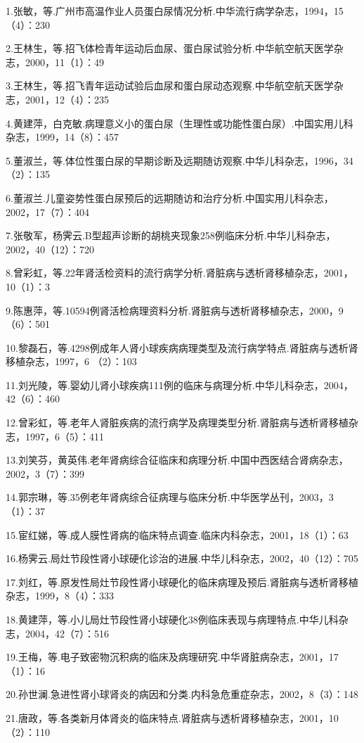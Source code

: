 1.张敏，等.广州市高温作业人员蛋白尿情况分析.中华流行病学杂志，1994，15（4）：230

2.王林生，等.招飞体检青年运动后血尿、蛋白尿试验分析.中华航空航天医学杂志，2000，11（1）：49

3.王林生，等.招飞青年运动试验后血尿和蛋白尿动态观察.中华航空航天医学杂志，2001，12（4）：235

4.黄建萍，白克敏.病理意义小的蛋白尿（生理性或功能性蛋白尿）.中国实用儿科杂志，1999，14（8）：457

5.董淑兰，等.体位性蛋白尿的早期诊断及远期随访观察.中华儿科杂志，1996，34（2）：135

6.董淑兰.儿童姿势性蛋白尿预后的远期随访和治疗分析.中国实用儿科杂志，2002，17（7）：404

7.张敬军，杨霁云.B型超声诊断的胡桃夹现象258例临床分析.中华儿科杂志，2002，40（12）：720

8.曾彩虹，等.22年肾活检资料的流行病学分析.肾脏病与透析肾移植杂志，2001，10（1）：3

9.陈惠萍，等.10594例肾活检病理资料分析.肾脏病与透析肾移植杂志，2000，9（6）：501

10.黎磊石，等.4298例成年人肾小球疾病病理类型及流行病学特点.肾脏病与透析肾移植杂志，1997，6
（2）：103

11.刘光陵，等.婴幼儿肾小球疾病111例的临床与病理分析.中华儿科杂志，2004，42（6）：460

12.曾彩虹，等.老年人肾脏疾病的流行病学及病理类型分析.肾脏病与透析肾移植杂志，1997，6（5）：411

13.刘笑芬，黄英伟.老年肾病综合征临床和病理分析.中国中西医结合肾病杂志，2002，3（7）：399

14.郭宗琳，等.35例老年肾病综合征病理与临床分析.中华医学丛刊，2003，3（1）：37

15.宦红娣，等.成人膜性肾病的临床特点调查.临床内科杂志，2001，18（1）：63

16.杨霁云.局灶节段性肾小球硬化诊治的进展.中华儿科杂志，2002，40（12）：705

17.刘红，等.原发性局灶节段性肾小球硬化的临床病理及预后.肾脏病与透析肾移植杂志，1999，8（4）：333

18.黄建萍，等.小儿局灶节段性肾小球硬化38例临床表现与病理特点.中华儿科杂志，2004，42（7）：516

19.王梅，等.电子致密物沉积病的临床及病理研究.中华肾脏病杂志，2001，17（1）：16

20.孙世澜.急进性肾小球肾炎的病因和分类.内科急危重症杂志，2002，8（3）：148

21.唐政，等.各类新月体肾炎的临床特点.肾脏病与透析肾移植杂志，2001，10（2）：110


